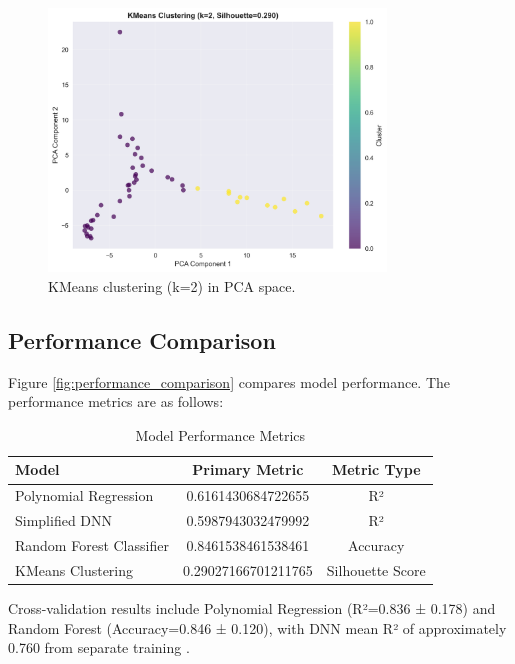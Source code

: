 \documentclass[12pt]{article}
\begin{document}
	\begin{figure}[H]
		\centering
		\includegraphics[width=0.8\textwidth]{../figures/clustering.png}
		\caption{KMeans clustering (k=2) in PCA space.}
		\label{fig:clustering}
	\end{figure}
	
	\subsection{Performance Comparison}
	Figure \ref{fig:performance_comparison} compares model performance. The performance metrics are as follows:
	
	\begin{table}[H]
		\centering
		\caption{Model Performance Metrics}
		\begin{tabular}{lcc}
			\toprule
			Model & Primary Metric & Metric Type \\
			\midrule
			Polynomial Regression & 0.6161430684722655 & R² \\
			Simplified DNN & 0.5987943032479992 & R² \\
			Random Forest Classifier & 0.8461538461538461 & Accuracy \\
			KMeans Clustering & 0.29027166701211765 & Silhouette Score \\
			\bottomrule
		\end{tabular}
		\label{tab:performance_summary}
	\end{table}
	
	Cross-validation results include Polynomial Regression (R²=0.836 ± 0.178) and Random Forest (Accuracy=0.846 ± 0.120), with DNN mean R² of approximately 0.760 from separate training \citep{chollet2015}.
	
\end{document}
